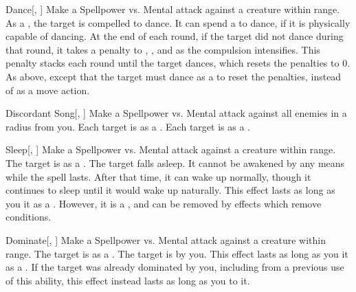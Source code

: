 \begin{ability}[\nth{3}]{Dance}[, ]
Make a Spellpower vs. Mental attack against a creature within \rngmed range.
\hit As a , the target is compelled to dance.
It can spend a  to dance, if it is physically capable of dancing.
At the end of each round, if the target did not dance during that round, it takes a  penalty to , , and  as the compulsion intensifies.
This penalty stacks each round until the target dances, which resets the penalties to 0.
\crit As above, except that the target must dance as a  to reset the penalties, instead of as a move action.
\end{ability}
\vspace{0.25em}


\begin{ability}[\nth{4}]{Discordant Song}[, ]
Make a Spellpower vs. Mental attack against all enemies in a \areamed radius from you.
\hit Each target is \disoriented as a .
\crit Each target is \confused as a .
\end{ability}
\vspace{0.25em}


\begin{ability}[\nth{4}]{Sleep}[, ]
Make a Spellpower vs. Mental attack against a creature within \rngmed range.
\hit The target is \blinded as a .
\crit The target falls asleep.
It cannot be awakened by any means while the spell lasts.
After that time, it can wake up normally, though it continues to sleep until it would wake up naturally.
This effect lasts as long as you  it as a .
However, it is a , and can be removed by effects which remove conditions.
\end{ability}
\vspace{0.25em}


\begin{ability}[\nth{5}]{Dominate}[, ]
Make a Spellpower vs. Mental attack against a creature within \rngmed range.
\hit The target is  as a .
\crit The target is  by you.
This effect lasts as long as you  it as a .
If the target was already dominated by you, including from a previous use of this ability, this effect instead lasts as long as you  to it.
\end{ability}
\vspace{0.25em}


